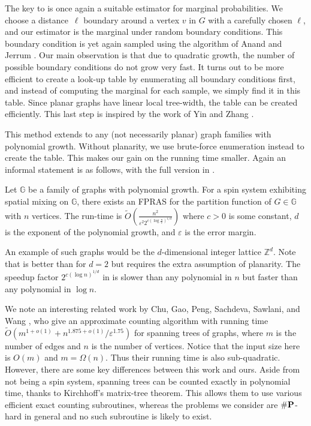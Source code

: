 \documentclass{theoretics}
\def\=#1{\mathbb{#1}}
\newcommand{\eps}{\varepsilon}
\newcommand{\numP}{\#{\textnormal{\textbf{P}}}}
\begin{document}
The key to  is once again a suitable estimator for marginal probabilities.
We choose a distance~$\ell$ boundary around a vertex $v$ in $G$ with a carefully chosen $\ell$,
and our estimator is the marginal under random boundary conditions.
This boundary condition is yet again sampled using the algorithm of Anand and Jerrum \cite{AJ22}.
Our main observation is that due to quadratic growth, 
the number of possible boundary conditions do not grow very fast.
It turns out to be more efficient to create a look-up table by enumerating all boundary conditions first,
and instead of computing the marginal for each sample,
we simply find it in this table.
Since planar graphs have linear local tree-width,
the table can be created efficiently.
This last step is inspired by the work of Yin and Zhang \cite{YZ13}.

This method extends to any (not necessarily planar) graph families with polynomial growth.
Without planarity, we use brute-force enumeration instead to create the table.
This makes our gain on the running time smaller.
Again an informal statement is as follows, with the full version in .

\begin{theorem} \label{thm:main3}
  Let $\=G$ be a family of graphs with polynomial growth.
  For a spin system exhibiting spatial mixing on $\=G$,
  there exists an FPRAS for the partition function of $G\in\=G$ with $n$ vertices.
  The run-time is $\widetilde{O}\left(\frac{n^2}{\eps^2 2^{c(\log \frac{n}{\eps})^{1/d}}}\right)$ where $c>0$ is some constant, $d$ is the exponent of the polynomial growth,
  and $\eps$ is the error margin.
\end{theorem}

An example of such graphs would be the $d$-dimensional integer lattice $\=Z^d$.
Note that  is better than  for $d=2$ but requires the extra assumption of planarity.
The speedup factor $2^{c(\log n)^{1/d}}$ in  is slower than any polynomial in $n$ but faster than any polynomial in $\log n$.

We note an interesting related work by Chu, Gao, Peng, Sachdeva, Sawlani, and Wang \cite{CGPSSW18},
who give an approximate counting algorithm with running time $\widetilde{O}(m^{1+o(1)}+n^{1.875+o(1)}/\eps^{1.75})$ for spanning trees of graphs,
where $m$ is the number of edges and $n$ is the number of vertices. Notice that the input size here is $O(m)$ and $m=\Omega(n)$.
Thus their running time is also sub-quadratic.
However, there are some key differences between this work and ours.
Aside from not being a spin system, spanning trees can be counted exactly in polynomial time, 
thanks to Kirchhoff's matrix-tree theorem.
This allows them to use various efficient exact counting subroutines,
whereas the problems we consider are $\numP$-hard in general and no such subroutine is likely to exist.
\end{document}
